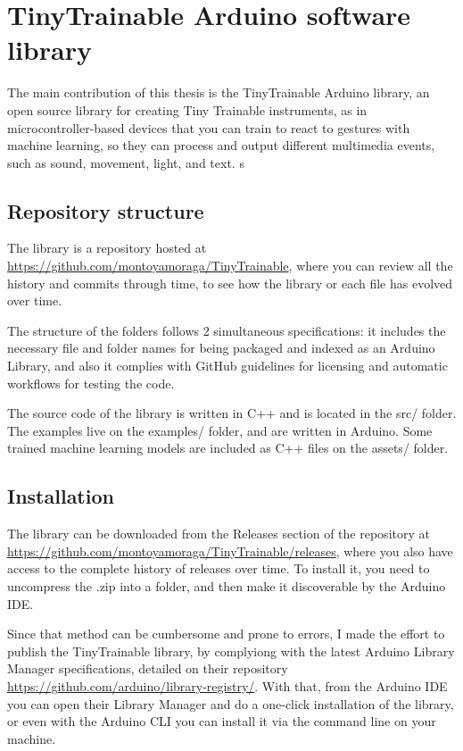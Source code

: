 \section{TinyTrainable Arduino software library}

The main contribution of this thesis is the TinyTrainable Arduino library, an open source library for creating Tiny Trainable instruments, as in microcontroller-based devices that you can train to react to gestures with machine learning, so they can process and output different multimedia events, such as sound, movement, light, and text.
s
\subsection{Repository structure}

The library is a repository hosted at \url{https://github.com/montoyamoraga/TinyTrainable}, where you can review all the history and commits through time, to see how the library or each file has evolved over time.

The structure of the folders follows 2 simultaneous specifications: it includes the necessary file and folder names for being packaged and indexed as an Arduino Library, and also it complies with GitHub guidelines for licensing and automatic workflows for testing the code.

The source code of the library is written in C++ and is located in the src/ folder. The examples live on the examples/ folder, and are written in Arduino. Some trained machine learning models are included as C++ files on the assets/ folder.

\subsection{Installation}

The library can be downloaded from the Releases section of the repository at  \url{https://github.com/montoyamoraga/TinyTrainable/releases}, where you also have access to the complete history of releases over time. To install it, you need to uncompress the .zip into a folder, and then make it discoverable by the Arduino IDE.

Since that method can be cumbersome and prone to errors, I made the effort to publish the TinyTrainable library, by complyiong with the latest Arduino Library Manager specifications, detailed on their repository \url{https://github.com/arduino/library-registry/}. With that, from the Arduino IDE you can open their Library Manager and do a one-click installation of the library, or even with the Arduino CLI you can install it via the command line on your machine.

